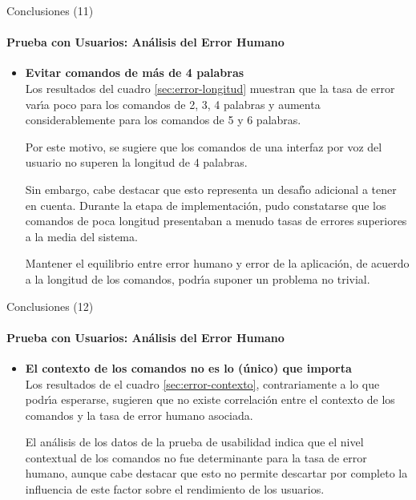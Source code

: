 \begin{frame}{Conclusiones (11)}
\framesubtitle{Prueba con Usuarios: An\'alisis del Error Humano}
\begin{itemize}
\item{\textbf{Evitar comandos de m\'as de 4 palabras\\}}
Los resultados del cuadro \ref{sec:error-longitud} muestran que la tasa de error var{{\'\i}}a 
poco para los comandos de 2, 3, 4 palabras y aumenta considerablemente para los comandos de 5 y 
6 palabras.

Por este motivo, se sugiere que los comandos de una interfaz por voz del usuario 
no superen la longitud de 4 palabras.

Sin embargo, cabe destacar que esto representa un desaf{{\'\i}}o adicional a tener en cuenta.
Durante la etapa de implementaci\'on, pudo constatarse que los comandos de poca longitud presentaban
a menudo tasas de errores superiores a la media del sistema.

Mantener el equilibrio entre error humano y error de la aplicaci\'on, de acuerdo a la longitud
de los comandos, podr{{\'\i}}a suponer un problema no trivial. 
\end{itemize}
\end{frame}

\begin{frame}{Conclusiones (12)}
\framesubtitle{Prueba con Usuarios: An\'alisis del Error Humano}
\begin{itemize}
\item{\textbf{El contexto de los comandos no es lo (\'unico) que importa\\}}
Los resultados de el cuadro \ref{sec:error-contexto}, contrariamente a lo que podr{\'\i}a esperarse,
sugieren que no existe correlaci\'on entre el contexto de los comandos y la tasa de error humano asociada.

El an\'alisis de los datos de la prueba de usabilidad indica que el nivel contextual de los comandos no
fue determinante para la tasa de error humano, aunque cabe destacar que esto no permite descartar
por completo la influencia de este factor sobre el rendimiento de los usuarios.


\end{itemize}
\end{frame}

